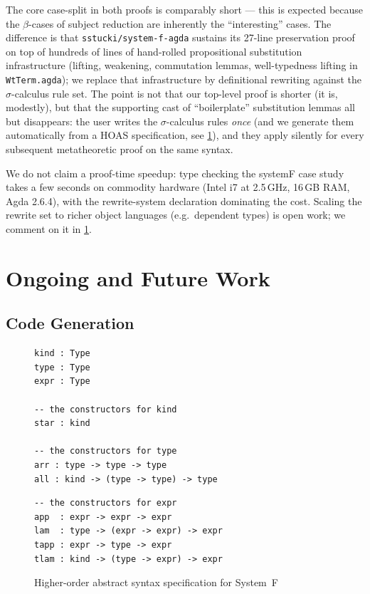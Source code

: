 \documentclass[a4paper,UKenglish,cleveref, autoref, thm-restate,anonymous]{lipics-v2021}
\begin{document}
\noindent The core case-split in both proofs is comparably short --- this is
expected because the $β$-cases of subject reduction are inherently the
``interesting'' cases. The difference is that
\texttt{sstucki/system-f-agda} sustains its 27-line preservation proof on
top of hundreds of lines of hand-rolled propositional substitution
infrastructure (lifting, weakening, commutation lemmas, well-typedness lifting
in \texttt{WtTerm.agda}); we replace that infrastructure by definitional
rewriting against the $σ$-calculus rule set. The point is not that our
top-level proof is shorter (it is, modestly), but that the supporting cast of
``boilerplate'' substitution lemmas all but disappears: the user writes the
$σ$-calculus rules \emph{once} (and we generate them automatically from a HOAS
specification, see \cref{sec:fwk}), and they apply silently for every
subsequent metatheoretic proof on the same syntax.

We do not claim a proof-time speedup: type checking the systemF case study
takes a few seconds on commodity hardware (Intel i7 at 2.5\,GHz, 16\,GB RAM,
Agda 2.6.4), with the rewrite-system declaration dominating the cost. Scaling
the rewrite set to richer object languages (e.g.\ dependent types) is open
work; we comment on it in \cref{sec:fwk}.

\section{Ongoing and Future Work}\label{sec:fwk}
\subsection{Code Generation}
\begin{figure}[!t]
      \begin{minipage}[t]{0.48\linewidth}
            \begin{verbatim}
kind : Type
type : Type
expr : Type

-- the constructors for kind 
star : kind

-- the constructors for type
arr : type -> type -> type
all : kind -> (type -> type) -> type
    \end{verbatim}
      \end{minipage}
      \begin{minipage}[t]{0.48\linewidth}
            \begin{verbatim}
-- the constructors for expr
app  : expr -> expr -> expr
lam  : type -> (expr -> expr) -> expr
tapp : expr -> type -> expr
tlam : kind -> (type -> expr) -> expr
      \end{verbatim}
      \end{minipage}
      \caption{Higher-order abstract  syntax specification for System~F}\label{fig:rel-hoa}
\end{figure}
\end{document}
